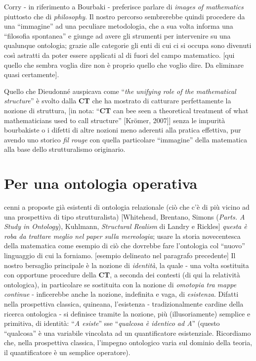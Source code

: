 \documentclass[a4paper, 11pt]{article}
\begin{document}
Corry - in riferimento a Bourbaki - preferisce parlare di \textit{images of mathematics} piuttosto che di \textit{philosophy}. Il nostro percorso sembrerebbe quindi procedere da una ``immagine'' ad una peculiare metodologia, che a sua volta informa una ``filosofia spontanea'' e giunge ad avere gli strumenti per intervenire su una qualunque ontologia; grazie alle categorie gli enti di cui ci si occupa sono divenuti così astratti da poter essere applicati al di fuori del campo matematico. [qui quello che sembra voglia dire non è proprio quello che voglio dire. Da eliminare quasi certamente].

Quello che Dieudonné auspicava come ``\textit{the unifying role of the mathematical structure}'' è svolto dalla \textbf{CT} che ha mostrato di catturare perfettamente la nozione di struttura, [in nota: ``\textbf{CT} can bee seen a theoretical treatment of what mathematicians used to call structure'' [Kr\"omer, 2007]] senza le impurità bourbakiste o i difetti di altre nozioni meno aderenti alla pratica effettiva, pur avendo uno storico \textit{fil rouge} con quella particolare ``immagine'' della matematica alla base dello strutturalismo originario.
\endfo
\section{Per una ontologia operativa}
cenni a proposte già esistenti di ontologia relazionale (ciò che c'è di più vicino ad una prospettiva di tipo strutturalista) [Whitehead, Brentano, Simons (\textit{Parts. A Study in Ontology}), Kuhlmann, \textit{Structural Realism} di Landry e Rickles] \textit{questa è roba da trattare meglio nel paper sulla mereologia}; usare la storia novecentesca della matematica come esempio di ciò che dovrebbe fare l'ontologia col ``nuovo'' linguaggio di cui la forniamo. [esempio delineato nel paragrafo precedente]
Il nostro bersaglio principale è la nozione di \textit{identità}, la quale - una volta sostituita con opportune procedure della \textbf{CT}, a seconda dei contesti (di qui la relatività ontologica), in particolare se sostituita con la nozione di \textit{omotopia tra mappe continue} - inficerebbe anche la nozione, indefinita e vaga, di \textit{esistenza}. Difatti nella prospettiva classica, quineana, l'esistenza - tradizionalmente cardine della ricerca ontologica - si definisce tramite la nozione, più (illusoriamente) semplice e primitiva, di identità: ``\textit{A esiste}'' sse ``\textit{qualcosa è identico ad A}'' (questo ``qualcosa'' è una variabile vincolata ad un quantificatore esistenziale. Ricordiamo che, nella prospettiva classica, l'impegno ontologico varia sul dominio della teoria, il quantificatore è un semplice operatore).
\end{document}
